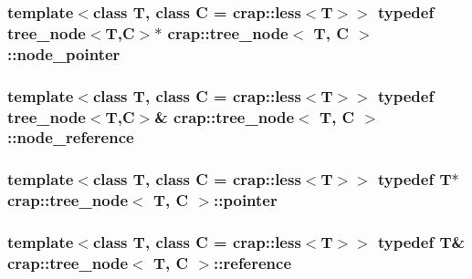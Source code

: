 \hypertarget{structcrap_1_1tree__node_a66cd96114fc5aaf9806032e15960edc5}{
\subsubsection[{node\-\_\-pointer}]{\setlength{\rightskip}{0pt plus 5cm}template$<$class T, class C = crap\-::less$<$\-T$>$$>$ typedef {\bf tree\-\_\-node}$<$T,C$>$$\ast$ {\bf crap\-::tree\-\_\-node}$<$ T, C $>$\-::{\bf node\-\_\-pointer}}}\label{structcrap_1_1tree__node_a66cd96114fc5aaf9806032e15960edc5}
\hypertarget{structcrap_1_1tree__node_a331a31f4a7a022fd6e6a71f834661d7f}{
\subsubsection[{node\-\_\-reference}]{\setlength{\rightskip}{0pt plus 5cm}template$<$class T, class C = crap\-::less$<$\-T$>$$>$ typedef {\bf tree\-\_\-node}$<$T,C$>$\& {\bf crap\-::tree\-\_\-node}$<$ T, C $>$\-::{\bf node\-\_\-reference}}}\label{structcrap_1_1tree__node_a331a31f4a7a022fd6e6a71f834661d7f}
\hypertarget{structcrap_1_1tree__node_acf5422f2e49c9fbf07f2ffd4f80c5a51}{
\subsubsection[{pointer}]{\setlength{\rightskip}{0pt plus 5cm}template$<$class T, class C = crap\-::less$<$\-T$>$$>$ typedef T$\ast$ {\bf crap\-::tree\-\_\-node}$<$ T, C $>$\-::{\bf pointer}}}\label{structcrap_1_1tree__node_acf5422f2e49c9fbf07f2ffd4f80c5a51}
\hypertarget{structcrap_1_1tree__node_a83b22dd92df6649565abe390e1f96b37}{
\subsubsection[{reference}]{\setlength{\rightskip}{0pt plus 5cm}template$<$class T, class C = crap\-::less$<$\-T$>$$>$ typedef T\& {\bf crap\-::tree\-\_\-node}$<$ T, C $>$\-::{\bf reference}}}\label{structcrap_1_1tree__node_a83b22dd92df6649565abe390e1f96b37}
